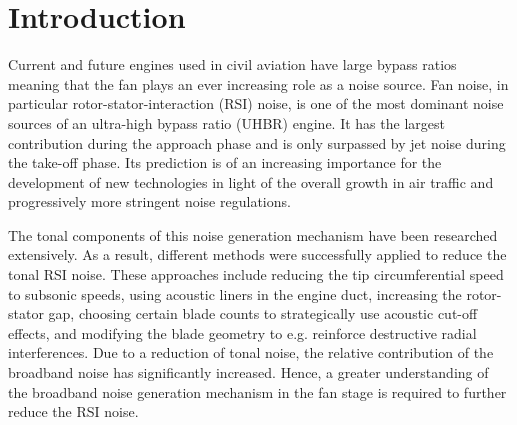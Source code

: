 
\section{Introduction}



Current and future engines used in civil aviation have large bypass ratios meaning that the fan plays an ever increasing role as a noise source. Fan noise, in particular rotor-stator-interaction (RSI) noise, is one of the most dominant noise sources of an ultra-high bypass ratio (UHBR) engine.  It has the largest contribution during the approach phase and is only surpassed by jet noise during the take-off phase. Its prediction is of an increasing importance for the development of new technologies in light of the overall growth in air traffic and progressively more stringent noise regulations.

The tonal components of this noise generation mechanism have been researched extensively.  As a result, different methods were successfully applied to reduce the tonal RSI noise.  These approaches include reducing the tip circumferential speed to subsonic speeds, using acoustic liners in the engine duct, increasing the rotor-stator gap, choosing certain blade counts to strategically use acoustic cut-off effects, and modifying the blade geometry to e.g. reinforce destructive radial interferences.  Due to a reduction of tonal noise, the relative contribution of the broadband noise has significantly increased.  Hence, a greater understanding of the broadband noise generation mechanism in the fan stage is required to further reduce the RSI noise. 


